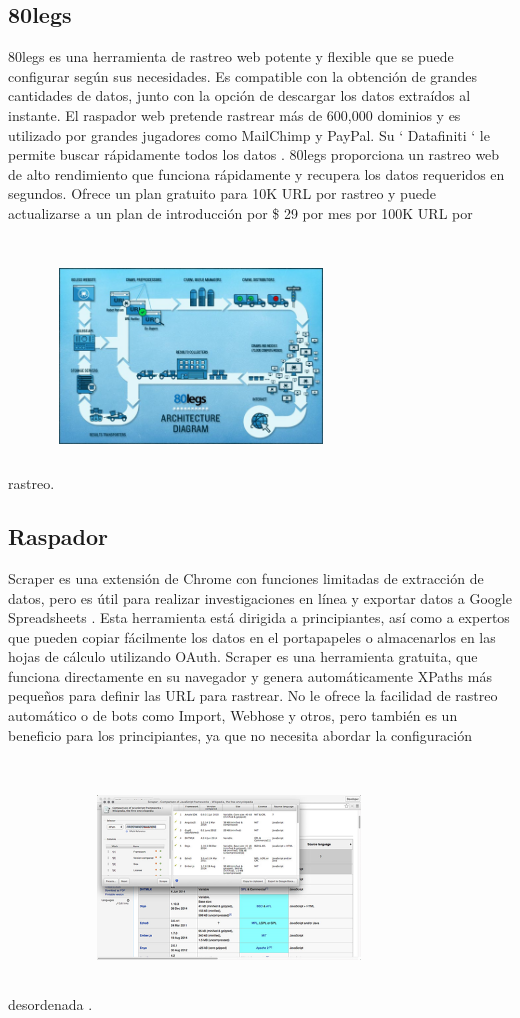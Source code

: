 \documentclass[twoside,twocolumn]{article}
\begin{document}
\subsection{80legs}
80legs es una herramienta de rastreo web potente y flexible que se
 puede configurar según sus necesidades. Es compatible con la obtención
  de grandes cantidades de datos, junto con la opción de descargar los
   datos extraídos al instante. El raspador web pretende rastrear más de
    600,000 dominios y es utilizado por grandes jugadores como MailChimp y PayPal.
Su ‘ Datafiniti ‘ le permite buscar rápidamente todos los datos . 80legs
 proporciona un rastreo web de alto rendimiento que funciona rápidamente 
 y recupera los datos requeridos en segundos. Ofrece un plan gratuito para
  10K URL por rastreo y puede actualizarse a un plan de introducción por
   \$ 29 por mes por 100K URL por rastreo.
   \includegraphics[width=7cm, height=7cm]{imagenes/9.png}


\subsection{Raspador}
Scraper es una extensión de Chrome con funciones limitadas de extracción de datos,
 pero es útil para realizar investigaciones en línea y exportar datos a Google 
 Spreadsheets . Esta herramienta está dirigida a principiantes, así como a expertos
  que pueden copiar fácilmente los datos en el portapapeles o almacenarlos en las 
  hojas de cálculo utilizando OAuth.
Scraper es una herramienta gratuita, que funciona directamente en su navegador y
 genera automáticamente XPaths más pequeños para definir las URL para rastrear. 
 No le ofrece la facilidad de rastreo automático o de bots como Import, Webhose 
 y otros, pero también es un beneficio para los principiantes, ya que no necesita 
 abordar la configuración desordenada .
 \includegraphics[width=7cm, height=7cm]{imagenes/10.png}
\end{document}

